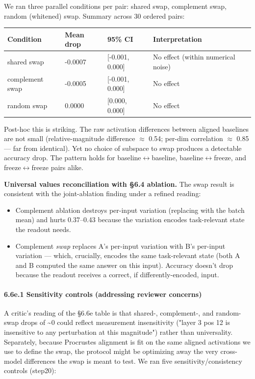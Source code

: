 We ran three parallel conditions per pair: shared swap, complement swap,
random (whitened) swap. Summary across 30 ordered pairs:

\begin{center}
\begin{tabular}{|l|l|l|l|}
\hline
\textbf{Condition} & \textbf{Mean drop} & \textbf{95\% CI} & \textbf{Interpretation} \\
\hline
shared swap & -0.0007 & [-0.001, 0.000] & No effect (within numerical noise) \\
complement swap & -0.0005 & [-0.001, 0.000] & No effect \\
random swap & 0.0000 & [0.000, 0.000] & No effect \\
\hline
\end{tabular}
\end{center}


Post-hoc this is striking. The raw activation differences between aligned
baselines are not small (relative-magnitude difference $\approx$ 0.54; per-dim
correlation $\approx$ 0.85 --- far from identical). Yet no choice of subspace to
swap produces a detectable accuracy drop. The pattern holds for
baseline$\leftrightarrow$baseline, baseline$\leftrightarrow$freeze, and freeze$\leftrightarrow$freeze pairs alike.

\textbf{Universal values reconciliation with \S{}6.4 ablation.} The swap result
is consistent with the joint-ablation finding under a refined reading:

\begin{itemize}
  \item Complement ablation destroys per-input variation (replacing with the batch mean) and hurts 0.37--0.43 because the variation encodes task-relevant state the readout needs.
  \item Complement \emph{swap} replaces A's per-input variation with B's per-input variation --- which, crucially, encodes the same task-relevant state (both A and B computed the same answer on this input). Accuracy doesn't drop because the readout receives a correct, if differently-encoded, input.
\end{itemize}

\paragraph{6.6e.1 Sensitivity controls (addressing reviewer concerns)}

A critic's reading of the \S{}6.6e table is that shared-, complement-, and
random-swap drops of \textasciitilde{}0 could reflect measurement insensitivity ("layer 3
pos 12 is insensitive to any perturbation at this magnitude") rather
than universality. Separately, because Procrustes alignment is fit on
the same aligned activations we use to define the swap, the protocol
might be optimizing away the very cross-model differences the swap is
meant to test. We ran five sensitivity/consistency controls (step20):

